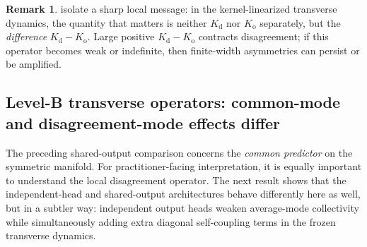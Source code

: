 \documentclass[11pt]{article}
\theoremstyle{definition}
\newtheorem{remark}[theorem]{Remark}
\begin{document}
\begin{remark}
 isolate a sharp local message:
in the kernel-linearized transverse dynamics,
the quantity that matters is neither $K_{\mathrm d}$ nor $K_{\mathrm o}$ separately,
but the \emph{difference} $K_{\mathrm d}-K_{\mathrm o}$.
Large positive $K_{\mathrm d}-K_{\mathrm o}$ contracts disagreement;
if this operator becomes weak or indefinite,
then finite-width asymmetries can persist or be amplified.
\end{remark}

\subsection{Level-B transverse operators: common-mode and disagreement-mode effects differ}

The preceding shared-output comparison concerns the \emph{common predictor} on the symmetric manifold.
For practitioner-facing interpretation, it is equally important to understand the local disagreement operator.
The next result shows that the independent-head and shared-output architectures behave differently here as well,
but in a subtler way:
independent output heads weaken average-mode collectivity while simultaneously adding extra diagonal self-coupling terms in the frozen transverse dynamics.
\end{document}
